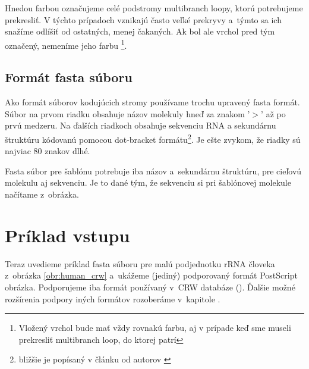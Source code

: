 Hnedou farbou označujeme celé podstromy multibranch loopy, ktorú potrebujeme
prekresliť. V týchto prípadoch vznikajú často veľké prekryvy a~týmto
sa ich snažíme odlíšiť od ostatných, menej čakaných.
Ak bol ale vrchol pred tým označený, nemeníme jeho farbu%
\footnote{Vložený vrchol bude mať vždy rovnakú farbu, aj v prípade
keď sme museli prekresliť multibranch loop, do ktorej patrí}.





\subsection{Formát fasta súboru}

Ako formát súborov kodujúcich stromy používame trochu upravený fasta formát.
Súbor na prvom riadku obsahuje názov molekuly hneď za znakom '$>$' až po prvú medzeru.
Na ďalších riadkoch obsahuje sekvenciu RNA a sekundárnu štruktúru kódovanú
pomocou dot-bracket formátu\footnote{bližšie je popísaný v článku od autorov \citet{DRAWING_COMPARISION}}.
Je ešte zvykom, že riadky sú najviac 80 znakov dlhé.

Fasta súbor pre šablónu potrebuje iba názov a~sekundárnu štruktúru,
pre cieľovú molekulu aj sekvenciu. Je to dané tým, že sekvenciu
si pri šablónovej molekule načítame z~obrázka.



\section{Príklad vstupu}

Teraz uvedieme príklad fasta súboru pre malú podjednotku rRNA človeka z~obrázka
\ref{obr:human_crw} a~ukážeme (jediný) podporovaný formát PostScript obrázka.
Podporujeme iba formát používaný v~CRW databáze (\citet{CRW}).
Ďalšie možné rozšírenia podpory iných formátov rozoberáme v~kapitole
.


